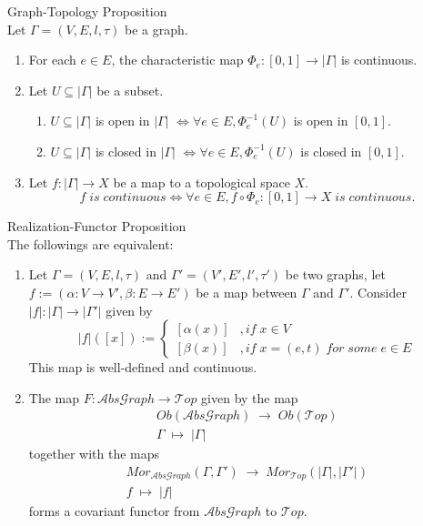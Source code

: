 \begin{proposition}{Graph-Topology Proposition}\\
Let $\Gamma= (V,E,l,\tau)$ be a graph.
\begin{enumerate}
    \item For each $e \in E$, the characteristic map $\Phi_e: [0,1] \to |\Gamma|$ is continuous.
    \item Let $U \subseteq |\Gamma|$ be a subset.
    \begin{enumerate}
        \item $U \subseteq |\Gamma|$ is open in $|\Gamma|$ $\Leftrightarrow \forall e \in E, \Phi_e^{-1} (U)$ is open in $[0,1]$.
        \item $U \subseteq |\Gamma|$ is closed in $|\Gamma|$ $\Leftrightarrow \forall e \in E, \Phi_e^{-1} (U)$ is closed in $[0,1]$.
    \end{enumerate}
    \item Let $f:|\Gamma| \to X$ be a map to a topological space $X$.
    $$f\;is\;continuous \Leftrightarrow \forall e \in E, f\circ \Phi_e: [0,1] \to X\;is\; continuous.$$
\end{enumerate}
\end{proposition}

\begin{proposition}{Realization-Functor Proposition}\\
The followings are equivalent:
\begin{enumerate}
    \item Let $\Gamma= (V,E,l,\tau)$ and $\Gamma'= (V',E',l',\tau')$ be two graphs, let $f:= (\alpha: V\to V',\beta: E\to E')$ be a map between $\Gamma$ and $\Gamma'$. Consider $|f|: |\Gamma| \to |\Gamma'|$ given by
    $$|f|([x]) := \begin{cases}
        [\alpha(x)] &,if\;x\in V\\
        [\beta(x)] &,if \;x= (e,t)\; for\;some\; e \in E
    \end{cases}$$
    This map is well-defined and continuous.

    \item The map $F:\mathcal{A}bs\mathcal{G}raph \to \mathcal{T}op$ given by the map
    $$\substack{Ob(\mathcal{A}bs\mathcal{G}raph) \; \to \; Ob(\mathcal{T}op)\\
    \Gamma \;\mapsto\; |\Gamma|}$$
    together with the maps
    $$\substack{Mor_{\mathcal{A}bs\mathcal{G}raph}(\Gamma,\Gamma') \;\to\; Mor_{\mathcal{T}op} (|\Gamma|,|\Gamma'|)\\
    f\;\mapsto\; |f|}$$
    forms a covariant functor from $\mathcal{A}bs\mathcal{G}raph$ to $\mathcal{T}op$.
\end{enumerate}
\end{proposition}

